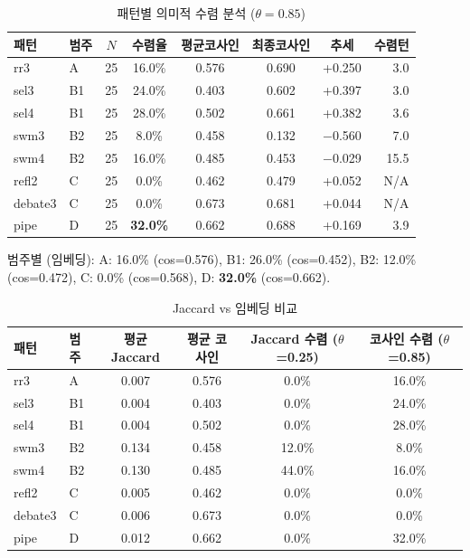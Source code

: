 \documentclass[a4paper,11pt]{article}
\begin{document}
\begin{table}[H]
\centering
\caption{패턴별 의미적 수렴 분석 ($\theta=0.85$)}
\label{tab:semantic-convergence}
{\small
\begin{tabular}{llcccccr}
\toprule
패턴 & 범주 & $N$ & 수렴율 & 평균코사인 & 최종코사인 & 추세 & 수렴턴 \\
\midrule
rr3     & A  & 25 & 16.0\% & 0.576 & 0.690 & +0.250  & 3.0 \\
sel3    & B1 & 25 & 24.0\% & 0.403 & 0.602 & +0.397  & 3.0 \\
sel4    & B1 & 25 & 28.0\% & 0.502 & 0.661 & +0.382  & 3.6 \\
swm3    & B2 & 25 & 8.0\%  & 0.458 & 0.132 & $-$0.560 & 7.0 \\
swm4    & B2 & 25 & 16.0\% & 0.485 & 0.453 & $-$0.029 & 15.5 \\
refl2   & C  & 25 & 0.0\%  & 0.462 & 0.479 & +0.052  & N/A \\
debate3 & C  & 25 & 0.0\%  & 0.673 & 0.681 & +0.044  & N/A \\
pipe    & D  & 25 & \textbf{32.0\%} & 0.662 & 0.688 & +0.169 & 3.9 \\
\bottomrule
\end{tabular}
}
\end{table}

범주별 (임베딩): A: 16.0\% (cos=0.576), B1: 26.0\% (cos=0.452), B2: 12.0\% (cos=0.472), C: 0.0\% (cos=0.568), D: \textbf{32.0\%} (cos=0.662).

\begin{table}[H]
\centering
\caption{Jaccard vs 임베딩 비교}
\label{tab:jaccard-vs-embedding}
{\footnotesize
\begin{tabular}{llcccc}
\toprule
패턴 & 범주 & 평균 Jaccard & 평균 코사인 & Jaccard 수렴 ($\theta$=0.25) & 코사인 수렴 ($\theta$=0.85) \\
\midrule
rr3     & A  & 0.007 & 0.576 & 0.0\%  & 16.0\% \\
sel3    & B1 & 0.004 & 0.403 & 0.0\%  & 24.0\% \\
sel4    & B1 & 0.004 & 0.502 & 0.0\%  & 28.0\% \\
swm3    & B2 & 0.134 & 0.458 & 12.0\% & 8.0\%  \\
swm4    & B2 & 0.130 & 0.485 & 44.0\% & 16.0\% \\
refl2   & C  & 0.005 & 0.462 & 0.0\%  & 0.0\%  \\
debate3 & C  & 0.006 & 0.673 & 0.0\%  & 0.0\%  \\
pipe    & D  & 0.012 & 0.662 & 0.0\%  & 32.0\% \\
\bottomrule
\end{tabular}
}
\end{table}
\end{document}
